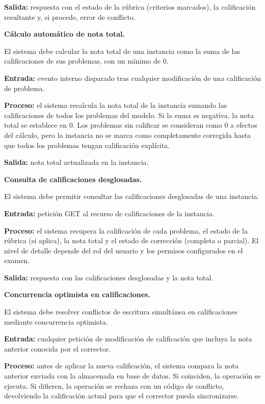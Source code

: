 \begin{functional}
\begin{functional}
    \textbf{Salida:} respuesta con el estado de la rúbrica (criterios marcados), la calificación resultante y, si procede, error de conflicto.

    \item \textbf{Cálculo automático de nota total.}

    El sistema debe calcular la nota total de una instancia como la suma de las calificaciones de sus problemas, con un mínimo de 0.

    \textbf{Entrada:} evento interno disparado tras cualquier modificación de una calificación de problema.

    \textbf{Proceso:} el sistema recalcula la nota total de la instancia sumando las calificaciones de todos los problemas del modelo. Si la suma es negativa, la nota total se establece en 0. Los problemas sin calificar se consideran como 0 a efectos del cálculo, pero la instancia no se marca como completamente corregida hasta que todos los problemas tengan calificación explícita.

    \textbf{Salida:} nota total actualizada en la instancia.

    \item \textbf{Consulta de calificaciones desglosadas.}

    El sistema debe permitir consultar las calificaciones desglosadas de una instancia.

    \textbf{Entrada:} petición GET al recurso de calificaciones de la instancia.

    \textbf{Proceso:} el sistema recupera la calificación de cada problema, el estado de la rúbrica (si aplica), la nota total y el estado de corrección (completa o parcial). El nivel de detalle depende del rol del usuario y los permisos configurados en el examen.

    \textbf{Salida:} respuesta con las calificaciones desglosadas y la nota total.

    \item \textbf{Concurrencia optimista en calificaciones.}

    El sistema debe resolver conflictos de escritura simultánea en calificaciones mediante concurrencia optimista.

    \textbf{Entrada:} cualquier petición de modificación de calificación que incluya la nota anterior conocida por el corrector.

    \textbf{Proceso:} antes de aplicar la nueva calificación, el sistema compara la nota anterior enviada con la almacenada en base de datos. Si coinciden, la operación se ejecuta. Si difieren, la operación se rechaza con un código de conflicto, devolviendo la calificación actual para que el corrector pueda sincronizarse.


\end{functional}
\end{functional}
